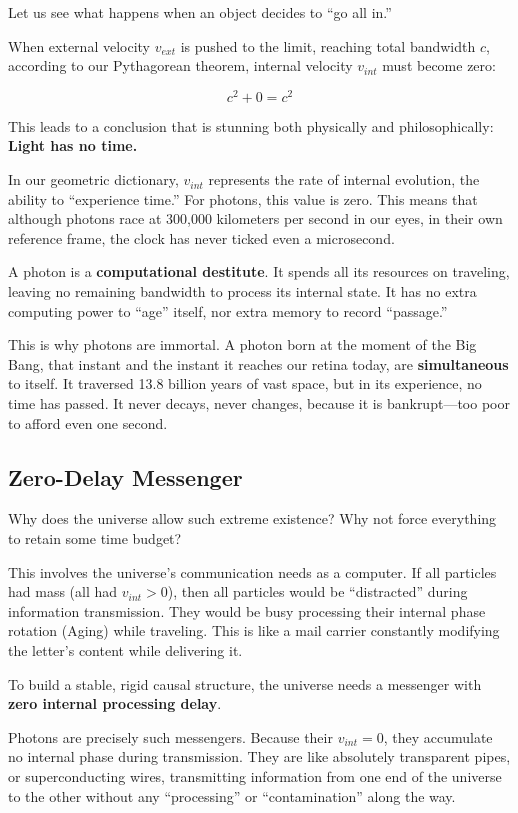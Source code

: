 \documentclass[11pt,a4paper,twoside]{book}
\begin{document}
Let us see what happens when an object decides to ``go all in.''

When external velocity $v_{ext}$ is pushed to the limit, reaching total bandwidth $c$, according to our Pythagorean theorem, internal velocity $v_{int}$ must become zero:

$$c^2 + 0 = c^2$$

This leads to a conclusion that is stunning both physically and philosophically: \textbf{Light has no time.}

In our geometric dictionary, $v_{int}$ represents the rate of internal evolution, the ability to ``experience time.'' For photons, this value is zero. This means that although photons race at 300,000 kilometers per second in our eyes, in their own reference frame, the clock has never ticked even a microsecond.

A photon is a \textbf{computational destitute}. It spends all its resources on traveling, leaving no remaining bandwidth to process its internal state. It has no extra computing power to ``age'' itself, nor extra memory to record ``passage.''

This is why photons are immortal. A photon born at the moment of the Big Bang, that instant and the instant it reaches our retina today, are \textbf{simultaneous} to itself. It traversed 13.8 billion years of vast space, but in its experience, no time has passed. It never decays, never changes, because it is bankrupt---too poor to afford even one second.

\subsection{Zero-Delay Messenger}

Why does the universe allow such extreme existence? Why not force everything to retain some time budget?

This involves the universe's communication needs as a computer. If all particles had mass (all had $v_{int} > 0$), then all particles would be ``distracted'' during information transmission. They would be busy processing their internal phase rotation (Aging) while traveling. This is like a mail carrier constantly modifying the letter's content while delivering it.

To build a stable, rigid causal structure, the universe needs a messenger with \textbf{zero internal processing delay}.

Photons are precisely such messengers. Because their $v_{int}=0$, they accumulate no internal phase during transmission. They are like absolutely transparent pipes, or superconducting wires, transmitting information from one end of the universe to the other without any ``processing'' or ``contamination'' along the way.
\end{document}
